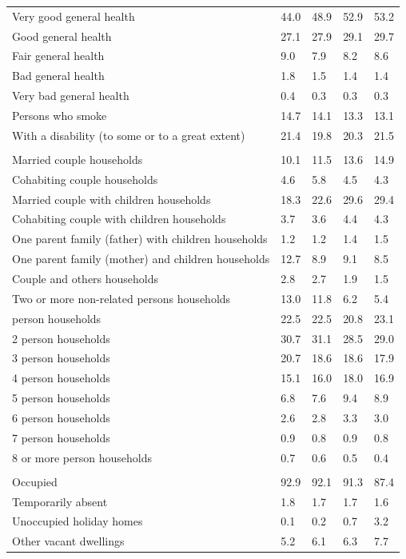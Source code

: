 \documentclass{article}
\begin{document}
\begin{table}[h]
\begin{tabular}{KTTTT}
    \hline
Very good general health & 44.0& 48.9&52.9& 53.2\\
Good general health & 27.1& 27.9& 29.1& 29.7\\
Fair general health & 9.0& 7.9&8.2& 8.6\\
Bad general health & 1.8& 1.5&1.4& 1.4\\
Very bad general health & 0.4& 0.3&0.3& 0.3\\
    \hline
Persons who smoke & 14.7& 14.1&13.3& 13.1\\
    \hline
With a disability (to some or to a great extent) & 21.4& 19.8&20.3& 21.5\\
\hline
    \\ 
    \hline
Married couple households & 10.1& 11.5& 13.6& 14.9\\
Cohabiting couple households & 4.6& 5.8& 4.5& 4.3\\
Married couple with children households & 18.3& 22.6& 29.6& 29.4\\
Cohabiting couple with children households & 3.7& 3.6& 4.4& 4.3\\
One parent family (father) with  children households & 1.2& 1.2& 1.4& 1.5\\
One parent family (mother) and children households & 12.7&  8.9&  9.1&  8.5\\
Couple and others households  & 2.8& 2.7& 1.9& 1.5\\
Two or more non-related persons households & 13.0& 11.8&  6.2&  5.4\\
     person households & 22.5& 22.5& 20.8& 23.1\\
2 person households & 30.7& 31.1& 28.5& 29.0\\
3 person households & 20.7& 18.6& 18.6& 17.9\\
4 person households & 15.1& 16.0& 18.0& 16.9\\
5 person households & 6.8& 7.6& 9.4& 8.9\\
6 person households & 2.6& 2.8& 3.3& 3.0\\
7 person households & 0.9& 0.8& 0.9& 0.8\\
8 or more person households & 0.7& 0.6& 0.5& 0.4\\
\hline
    \\ 
    \hline
Occupied & 92.9& 92.1& 91.3& 87.4\\
Temporarily absent & 1.8& 1.7& 1.7& 1.6\\
Unoccupied holiday homes & 0.1& 0.2& 0.7& 3.2\\
Other vacant dwellings & 5.2& 6.1& 6.3& 7.7\\
\hline
\end{tabular}
\end{table}
\end{document}
